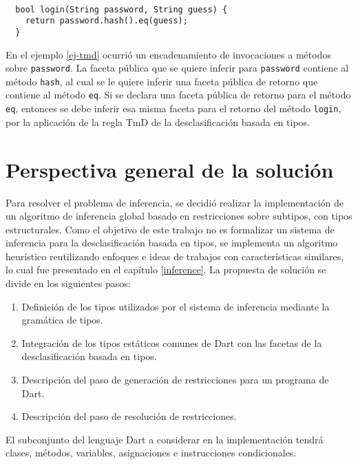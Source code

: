 \begin{ej} \ \\
  \label{ej-tmd}
  \normalfont
\begin{lstlisting}
  bool login(String password, String guess) {
    return password.hash().eq(guess);
  }
\end{lstlisting}
\end{ej}

En el ejemplo \ref{ej-tmd} ocurrió un encadenamiento de invocaciones a métodos sobre \texttt{password}. La faceta pública que se quiere inferir para \texttt{password} contiene al método \texttt{hash}, al cual se le quiere inferir una faceta pública de retorno que contiene al método \texttt{eq}. Si se declara una faceta pública de retorno para el método \texttt{eq}, entonces se debe inferir esa misma faceta para el retorno del método \texttt{login}, por la aplicación de la regla $\text{TmD}$ de la desclasificación basada en tipos.

\section{Perspectiva general de la solución} \label{diseno}
Para resolver el problema de inferencia, se decidió realizar la implementación de un algoritmo de inferencia global basado en restricciones sobre subtipos, con tipos estructurales. Como el objetivo de este trabajo no es formalizar un sistema de inferencia para la desclasificación basada en tipos, se implementa un algoritmo heurístico reutilizando enfoques e ideas de trabajos con características similares, lo cual fue presentado en el capítulo \ref{inference}. La propuesta de solución se divide en los siguientes pasos:

\begin{enumerate}
  \item Definición de los tipos utilizados por el sistema de inferencia mediante la gramática de tipos.
  \item Integración de los tipos estáticos comunes de Dart con las facetas de la desclasificación basada en tipos.
  \item Descripción del paso de generación de restricciones para un programa de Dart.
  \item Descripción del paso de resolución de restricciones.
\end{enumerate}

El subconjunto del lenguaje Dart a considerar en la implementación tendrá clases, métodos, variables, asignaciones e instrucciones condicionales.

